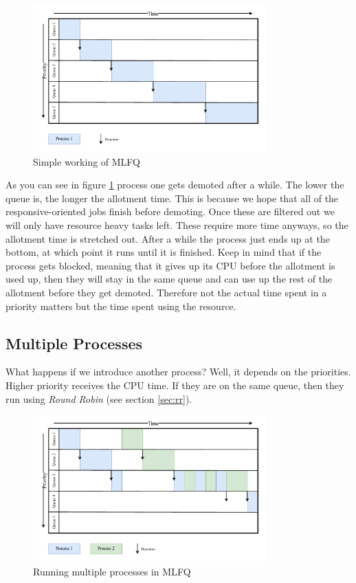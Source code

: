 \begin{figure}[h]
    \centering
    \includegraphics[width=0.8\textwidth]{Assets/MLFQ-Example-1.pdf}
    \caption{Simple working of MLFQ}
    \label{fig:mlfq-example-1}
\end{figure}


As you can see in figure \ref{fig:mlfq-example-1} process one gets demoted after a while.
The lower the queue is, the longer the allotment time. 
This is because we hope that all of the responsive-oriented jobs finish before demoting.
Once these are filtered out we will only have resource heavy tasks left.
These require more time anyways, so the allotment time is stretched out.
After a while the process just ends up at the bottom, at which point it runs until it is finished.
Keep in mind that if the process gets blocked, meaning that it gives up its CPU before the allotment is used up, then they will stay in the same queue and can use up the rest of the allotment before they get demoted. Therefore not the actual time spent in a priority matters but the time spent using the resource.

\subsection{Multiple Processes}

What happens if we introduce another process?
Well, it depends on the priorities. 
Higher priority receives the CPU time.
If they are on the same queue, then they run using \emph{Round Robin} (see section \ref{sec:rr}).


\begin{figure}[h]
    \centering
    \includegraphics[width=0.8\textwidth]{Assets/MLFQ-Example-2.pdf}
    \caption{Running multiple processes in MLFQ}
    \label{fig:mlfq-example-2}
\end{figure}

